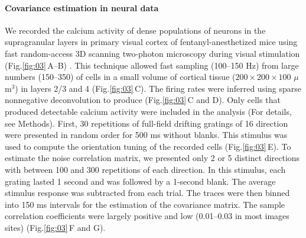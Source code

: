 \documentclass[10pt]{article}
\newcommand{\figref}[2]{Fig.\;\ref{fig:#1}\,#2}
\begin{document}
\paragraph{Covariance estimation in neural data}
We recorded the calcium activity of dense populations of neurons in the supragranular layers in primary visual cortex of fentanyl-anesthetized mice using fast random-access 3D scanning two-photon microscopy during visual stimulation (\figref{03}{A--B}) \cite{Reddy:2005, Katona:2012, Cotton:2013}. This technique allowed fast sampling (100--150 Hz) from large numbers (150--350) of cells in a small volume of cortical tissue ($200\times200\times100$ $\mu$m$^3$) in layers 2/3 and 4 (\figref{03}{C}).  The firing rates were inferred using sparse nonnegative deconvolution \cite{Vogelstein:2010} to produce (\figref{03}{C and D}). Only cells that produced detectable calcium activity were included in the analysis (For details, see Methods).  First, 30 repetitions of full-field drifting gratings of 16 direction were presented in random order for 500 ms without blanks.  This stimulus was used to compute the orientation tuning of the recorded cells (\figref{03}{E}). To estimate the noise correlation matrix, we presented only 2 or 5 distinct directions with between 100 and 300 repetitions of each direction. In this stimulus, each grating lasted 1 second and was followed by a 1-second blank.  The average stimulus response was subtracted from each trial. The traces were then binned into 150 ms intervals for the estimation of the covariance matrix.   The sample correlation coefficients were largely positive and low (0.01--0.03 in most images sites) (\figref{03}{F and G}).  
\end{document}
